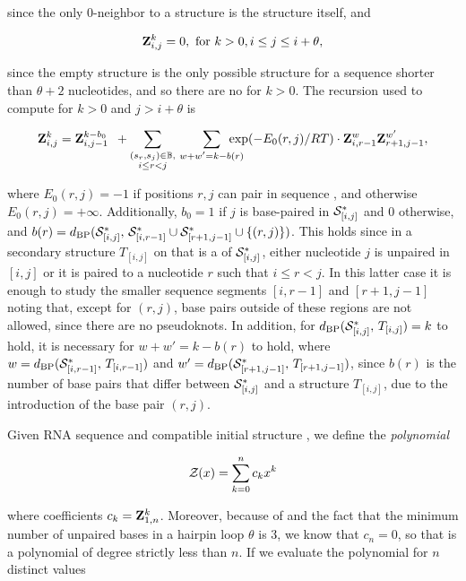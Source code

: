 since the only 0-neighbor to a structure \strSt
is the structure \strSt itself, and

\begin{align}
\label{eq:fftbor:initZpart2}
\bfZ{k}{i,j} = 0, \text{ for } k > 0, i \le j \leq i + \theta,
\end{align}

since the empty structure is the only possible structure for a
sequence shorter than $\theta + 2$ nucleotides, and so there are no
\kNbrs for $k>0$. The recursion used to compute
 for $k > 0$ and $j > i+\theta$ is

\begin{align}
\label{eq:fftbor:bfZkij}
\bfZ{k}{i,j} = \bfZ{k-b_0}{i,j-1}\enspace +
\sum_{\substack{(s_r,s_j) \in \bpSet, \\ i \leq r<j}}\qquad
\sum_{\mathclap{w+w'=k-b(r)}}\enspace
\exp(-E_0(r,j)/RT) \cdot \bfZ{w}{i,r-1} \bfZ{w'}{r+1,j-1},
\end{align}

where $E_0(r,j) = -1$ if positions $r,j$ can pair in sequence \seq,
and otherwise $E_0(r,j) = +\infty$. Additionally,
$b_0 = 1$ if $j$ is base-paired
in $\mathcal S^*_{[i,j]}$ and 0 otherwise, and
$b(r)=d_{\text{BP}}(\mathcal S^*_{[i,j]},\,\mathcal S^*_{[i,r-1]} \cup \mathcal S^*_{[r+1,j-1]} \cup\{(r,j)\})$.
This holds since in a secondary
structure $T_{[i,j]}$ on \seqIJ that is a \kNbr of
$\mathcal S^*_{[i,j]}$,
either nucleotide $j$ is unpaired in $[i,j]$ or it is
paired to a nucleotide $r$ such that $i \leq r < j$. In this
latter case it is enough to study the smaller sequence segments
$[i,r-1]$ and $[r+1,j-1]$ noting that, except for $(r,j)$,
base pairs outside of these regions are not allowed, since there
are no pseudoknots. In addition,
for $d_{\text{BP}}(\mathcal S^*_{[i,j]},\,T_{[i,j]}) = k$ to hold,
it is necessary for $w+w' = k -b(r)$ to hold, where $w =
d_{\text{BP}}(\mathcal S^*_{[i,r-1]},\,T_{[i,r-1]})$ and $w' =
d_{\text{BP}}(\mathcal S^*_{[r+1,j-1]},\,T_{[r+1,j-1]})$, since $b(r)$ is the
number of base pairs that differ between $\mathcal S^*_{[i,j]}$ and a
structure $T_{[i,j]}$, due to the introduction of the base pair
$(r,j)$.

Given RNA sequence \seq and compatible initial structure \strSt,
we define the {\em polynomial}

\begin{align}
\label{eq:fftbor:zOfX}
\fullZx = \sum_{k=0}^n c_k x^k
\end{align}

where coefficients $c_k={\bf Z}^{k}_{1,n}$. Moreover, because of
 and the fact that the minimum number of
unpaired bases in a hairpin loop $\theta$ is 3, we know that $c_n=0$,
so that \fullZx is a polynomial of degree strictly less than $n$.
If we evaluate the polynomial \fullZx for $n$ distinct values

